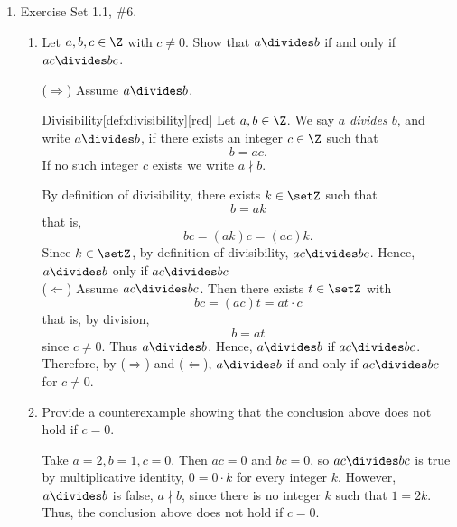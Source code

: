 \begin{enumerate}
  \item Exercise Set 1.1, \#6.
  \begin{enumerate}
    \item Let $a,b, c\in \Z$ with $c\neq 0$. Show that $a\divides b$ if and only if $ac \divides bc$.
    \begin{subprove}
      ($\Rightarrow$) Assume $a\divides b$. 
      \begin{define}{Divisibility}[def:divisibility][red]
      Let $a,b\in\Z$. We say \emph{$a$ divides $b$}, and write $a\divides b$, if there exists an 
      integer $c\in\Z$ such that
      \[
      b = a c.
      \]
      If no such integer $c$ exists we write $a\nmid b$.
      \end{define}
      By definition of divisibility, there exists $k\in\setZ$ such that
      \[
        b = a k
      \]
      that is,
      \[
        bc = (a k)c = (ac)k.
      \]
      Since $k\in\setZ$, by definition of divisibility, $ac\divides bc$. 
      Hence, $a\divides b$ only if $ac \divides bc$\vspace*{10px}\\
      ($\Leftarrow$) Assume $ac\divides bc$. Then there exists $t\in\setZ$ with
      \[
        bc = (ac)t = at\cdot c
      \]
      that is, by division,
      \[
        b = a t
      \]
      since $c\neq 0$.
      Thus $a\divides b$. Hence, $a\divides b$ if $ac \divides bc$.\vspace*{10px}\\
      Therefore, by ($\Rightarrow$) and ($\Leftarrow$), $a\divides b$ if and only if $ac \divides bc$ for $c\neq 0$.
    \end{subprove}

    \item Provide a counterexample showing that the conclusion above does not hold if $c = 0$.
    \begin{subanswer}
      Take $a=2, b=1, c=0$. Then $ac = 0$ and $bc=0$, so $ac\divides bc$ is true by 
      multiplicative identity, $0=0\cdot k$ for every integer $k$.
      However,  $a\divides b$ is false, $a\nmid b$, since there is no integer $k$ such that $1=2k$. 
      Thus, the conclusion above does not hold if $c = 0$.
    \end{subanswer}
  \end{enumerate}

  \newpage


\end{enumerate}
